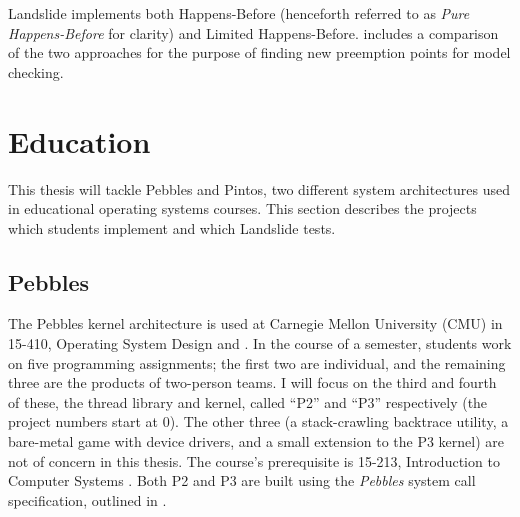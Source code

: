 Landslide implements both Happens-Before (henceforth referred to as {\em Pure Happens-Before} for clarity) and Limited Happens-Before.
 includes a comparison of the two approaches for the purpose of finding new preemption points for model checking.


\section{Education}
\label{sec:overview-edu}

This thesis will tackle Pebbles and Pintos, two different system architectures used in educational operating systems courses.
This section describes the projects which students implement and which Landslide tests.

\subsection{Pebbles}
\label{sec:pebbles}

The Pebbles kernel architecture
is used at Carnegie Mellon University (CMU) in 15-410, Operating System Design and  \cite{kspec,thrlib}.
In the course of a semester, students work on five programming assignments;
the first two are individual, and the remaining three are the products of two-person teams.
I will focus on the third and fourth of these, the thread library and kernel,
called ``P2'' and ``P3'' respectively (the project numbers start at 0).
The other three (a stack-crawling backtrace utility, a bare-metal game with device drivers, and a small extension to the P3 kernel) are not of concern in this thesis.
The course's prerequisite is 15-213, Introduction to Computer Systems \cite{csapp,sigcse01:CSaPP}.
Both P2 and P3 are built using the {\em Pebbles} system call specification, outlined in .

